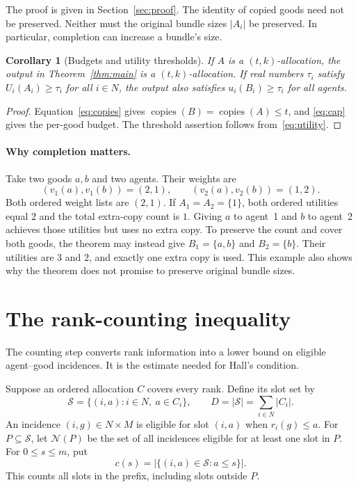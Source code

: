 \documentclass[11pt,a4paper]{article}
\newtheorem{corollary}[theorem]{Corollary}
\newcommand{\copies}{\operatorname{copies}}
\newcommand{\nbr}{\mathcal N}
\begin{document}
The proof is given in Section~\ref{sec:proof}. The identity of copied goods
need not be preserved. Neither must the original bundle sizes $|A_i|$ be
preserved. In particular, completion can increase a bundle's size.

\begin{corollary}[Budgets and utility thresholds]\label{cor:threshold}
If $A$ is a $(t,k)$-allocation, the output in Theorem~\ref{thm:main} is a
$(t,k)$-allocation. If real numbers $\tau_i$ satisfy $U_i(A_i)\ge\tau_i$ for
all $i\in N$, the output also satisfies $u_i(B_i)\ge\tau_i$ for all agents.
\end{corollary}
\begin{proof}
Equation~\eqref{eq:copies} gives $\copies(B)=\copies(A)\le t$, and
\eqref{eq:cap} gives the per-good budget. The threshold assertion follows
from~\eqref{eq:utility}.
\end{proof}

\paragraph{Why completion matters.}
Take two goods $a,b$ and two agents. Their weights are
\[
 (v_1(a),v_1(b))=(2,1),\qquad (v_2(a),v_2(b))=(1,2).
\]
Both ordered weight lists are $(2,1)$. If $A_1=A_2=\{1\}$, both ordered
utilities equal $2$ and the total extra-copy count is $1$.
Giving $a$ to agent~1 and $b$ to agent~2 achieves those utilities but uses
no extra copy. To preserve the count and cover both goods, the theorem may
instead give $B_1=\{a,b\}$ and $B_2=\{b\}$. Their utilities are $3$ and $2$,
and exactly one extra copy is used. This example also shows why the theorem
does not promise to preserve original bundle sizes.

\section{The rank-counting inequality}\label{sec:count}
The counting step converts rank information into a lower bound on eligible
agent--good incidences. It is the estimate needed for Hall's condition.

Suppose an ordered allocation $C$ covers every rank. Define its slot set by
\[
 \mathcal S=\{(i,a):i\in N,\ a\in C_i\},
 \qquad D=|\mathcal S|=\sum_{i\in N}|C_i|.
\]
An incidence $(i,g)\in N\times M$ is eligible for slot $(i,a)$ when
$r_i(g)\le a$. For $P\subseteq\mathcal S$, let $\nbr(P)$ be the set of all
incidences eligible for at least one slot in $P$. For $0\le s\le m$, put
\[
 c(s)=|\{(i,a)\in\mathcal S:a\le s\}|.
\]
This counts all slots in the prefix, including slots outside $P$.
\end{document}
